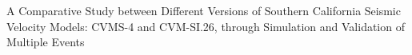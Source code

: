 % 
A Comparative Study between Different Versions of Southern California Seismic Velocity Models: CVMS-4 and CVM-SI.26, through Simulation and Validation of Multiple Events
% 

